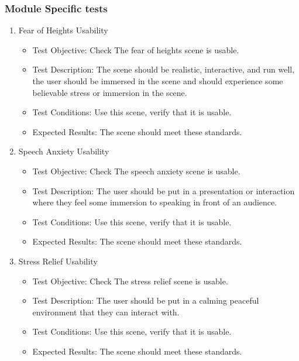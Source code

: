 \documentclass[a4paper,10pt]{article}
\begin{document}
\subsubsection{Module Specific tests}
\begin{enumerate}
    \item  Fear of Heights Usability
    \begin{itemize}
	\item Test Objective: Check The fear of heights scene is usable.
	\item Test Description: The scene should be realistic, interactive, and run well, the user should be immersed in 
	the scene and should experience some believable stress or immersion in the scene.
	\item Test Conditions: Use this scene, verify that it is usable.
	\item Expected Results: The scene should meet these standards.
    \end{itemize}
    \item  Speech Anxiety Usability
    \begin{itemize}
	\item Test Objective: Check The speech anxiety  scene is usable.
	\item Test Description: The user should be put in a presentation or interaction where they feel some immersion to speaking in front of an audience.
	\item Test Conditions: Use this scene, verify that it is usable.
	\item Expected Results: The scene should meet these standards.
    \end{itemize}
    \item  Stress Relief Usability
    \begin{itemize}
	\item Test Objective: Check The stress relief scene is usable.
	\item Test Description: The user should be put in a calming peaceful environment that they can interact with.
	\item Test Conditions: Use this scene, verify that it is usable.
	\item Expected Results: The scene should meet these standards.
    \end{itemize}
    

\end{enumerate}
\pagebreak

\end{document}
